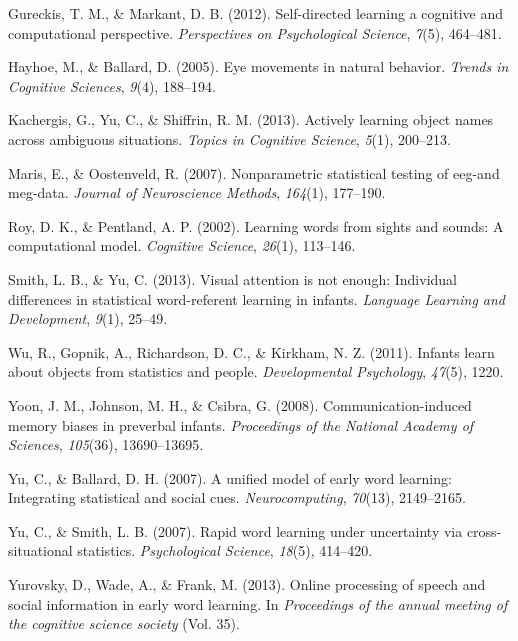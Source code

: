\documentclass[10pt, letterpaper]{article}
\begin{document}
\leavevmode\hypertarget{ref-gureckis2012self}{}%
Gureckis, T. M., \& Markant, D. B. (2012). Self-directed learning a
cognitive and computational perspective. \emph{Perspectives on
Psychological Science}, \emph{7}(5), 464--481.

\leavevmode\hypertarget{ref-hayhoe2005eye}{}%
Hayhoe, M., \& Ballard, D. (2005). Eye movements in natural behavior.
\emph{Trends in Cognitive Sciences}, \emph{9}(4), 188--194.

\leavevmode\hypertarget{ref-kachergis2013actively}{}%
Kachergis, G., Yu, C., \& Shiffrin, R. M. (2013). Actively learning
object names across ambiguous situations. \emph{Topics in Cognitive
Science}, \emph{5}(1), 200--213.

\leavevmode\hypertarget{ref-maris2007nonparametric}{}%
Maris, E., \& Oostenveld, R. (2007). Nonparametric statistical testing
of eeg-and meg-data. \emph{Journal of Neuroscience Methods},
\emph{164}(1), 177--190.

\leavevmode\hypertarget{ref-roy2002learning}{}%
Roy, D. K., \& Pentland, A. P. (2002). Learning words from sights and
sounds: A computational model. \emph{Cognitive Science}, \emph{26}(1),
113--146.

\leavevmode\hypertarget{ref-smith2013visual}{}%
Smith, L. B., \& Yu, C. (2013). Visual attention is not enough:
Individual differences in statistical word-referent learning in infants.
\emph{Language Learning and Development}, \emph{9}(1), 25--49.

\leavevmode\hypertarget{ref-wu2011infants}{}%
Wu, R., Gopnik, A., Richardson, D. C., \& Kirkham, N. Z. (2011). Infants
learn about objects from statistics and people. \emph{Developmental
Psychology}, \emph{47}(5), 1220.

\leavevmode\hypertarget{ref-yoon2008communication}{}%
Yoon, J. M., Johnson, M. H., \& Csibra, G. (2008). Communication-induced
memory biases in preverbal infants. \emph{Proceedings of the National
Academy of Sciences}, \emph{105}(36), 13690--13695.

\leavevmode\hypertarget{ref-yu2007unified}{}%
Yu, C., \& Ballard, D. H. (2007). A unified model of early word
learning: Integrating statistical and social cues.
\emph{Neurocomputing}, \emph{70}(13), 2149--2165.

\leavevmode\hypertarget{ref-yu2007rapid}{}%
Yu, C., \& Smith, L. B. (2007). Rapid word learning under uncertainty
via cross-situational statistics. \emph{Psychological Science},
\emph{18}(5), 414--420.

\leavevmode\hypertarget{ref-yurovsky2013online}{}%
Yurovsky, D., Wade, A., \& Frank, M. (2013). Online processing of speech
and social information in early word learning. In \emph{Proceedings of
the annual meeting of the cognitive science society} (Vol. 35).


\end{document}
